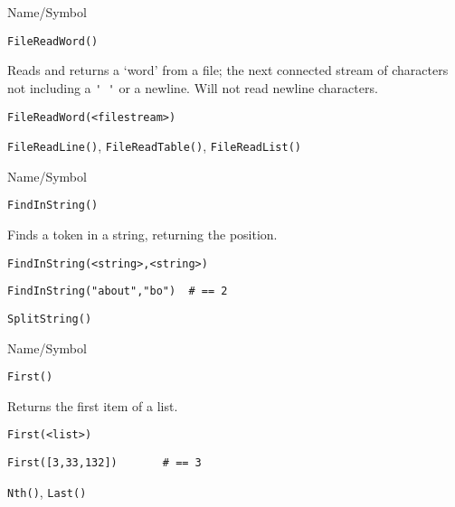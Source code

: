\begin{desc}{Name/Symbol}
\item[Name/Symbol]	\verb+FileReadWord()+

\item[Description]	Reads and returns  a `word' from a file; the next
		connected stream of characters not including a \verb+' '+
		or a newline. Will not read newline characters.

\item[Usage]
\begin{verbatim}
FileReadWord(<filestream>)
\end{verbatim}

\item[Example]	

\item[See Also]	\verb+FileReadLine()+, \verb+FileReadTable()+, \verb+FileReadList()+
\end{desc}

\rl




\begin{desc}{Name/Symbol}
\item[Name/Symbol]	\verb+FindInString()+

\item[Description]	Finds a token in a string, returning the position.

\item[Usage]
\begin{verbatim}
FindInString(<string>,<string>)
\end{verbatim}

\item[Example]
\begin{verbatim}
FindInString("about","bo") 	# == 2
\end{verbatim}

\item[See Also]	\verb+SplitString()+
\end{desc}

\rl




\begin{desc}{Name/Symbol}
\item[Name/Symbol]	\verb+First()+

\item[Description]	Returns the first item of a list.

\item[Usage]
\begin{verbatim}
First(<list>)
\end{verbatim}

\item[Example]
\begin{verbatim}
First([3,33,132])		# == 3
\end{verbatim}

\item[See Also]	\verb+Nth()+, \verb+Last()+
\end{desc}

